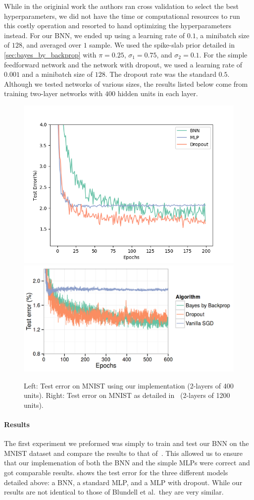\documentclass[11pt]{article}
\begin{document}
While in the originial work the authors ran cross validation to select the best
hyperparameters, we did not have the time or computational resources to run this
costly operation and resorted to hand optimizing the hyperparameters instead.
For our BNN, we ended up using a learning rate of $0.1$, a minibatch size of 
$128$, and averaged over $1$ sample. We used the spike-slab prior detailed in
\cref{sec:bayes_by_backprop} with $\pi = 0.25$, $\sigma_1 = 0.75$, and 
$\sigma_2 = 0.1$. For the simple feedforward network and the network with 
dropout, we used a learning rate of $0.001$ and a minibatch size of $128$.
The dropout rate was the standard $0.5$. Although we tested networks of various
sizes, the results listed below come from training two-layer networks with
$400$ hidden units in each layer.

\begin{figure}[H]
  \centering\includegraphics[width=.45\textwidth]{figures/test_error_compare.png}
  \centering\includegraphics[width=.45\textwidth]{figures/test_error_compare_paper.png}
  \caption{Left: Test error on MNIST using our implementation (2-layers of 400 units).
  Right: Test error on MNIST as detailed in~\cite{blundell} (2-layers of 1200 units).}
  \label{fig:mnist_test_error}
\end{figure}
 

\paragraph{Results}

The first experiment we preformed was simply to train and test our BNN on the
MNIST dataset and compare the results to that of~\cite{blundell}. This allowed
us to ensure that our implemenation of both the BNN and the simple MLPs were
correct and got comparable results.  shows the
test error for the three different models detailed above: a BNN, a standard
MLP, and a MLP with dropout. While our results are not identical to those of
Blundell et al.\, they are very similar. 
\end{document}
